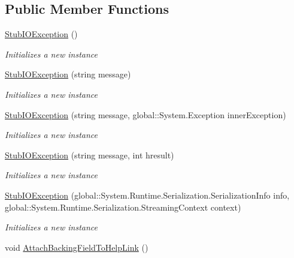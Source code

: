 \subsection*{Public Member Functions}
\begin{DoxyCompactItemize}
\item 
\hyperlink{class_system_1_1_i_o_1_1_fakes_1_1_stub_i_o_exception_a632db48de57725a9f9006c1367a88d7d}{Stub\-I\-O\-Exception} ()
\begin{DoxyCompactList}\small\item\em Initializes a new instance\end{DoxyCompactList}\item 
\hyperlink{class_system_1_1_i_o_1_1_fakes_1_1_stub_i_o_exception_a9a5b6db98677ec64d17792e6727a36d6}{Stub\-I\-O\-Exception} (string message)
\begin{DoxyCompactList}\small\item\em Initializes a new instance\end{DoxyCompactList}\item 
\hyperlink{class_system_1_1_i_o_1_1_fakes_1_1_stub_i_o_exception_a56e314a4be1640d91e2deed6fe8be1d0}{Stub\-I\-O\-Exception} (string message, global\-::\-System.\-Exception inner\-Exception)
\begin{DoxyCompactList}\small\item\em Initializes a new instance\end{DoxyCompactList}\item 
\hyperlink{class_system_1_1_i_o_1_1_fakes_1_1_stub_i_o_exception_a76f0a9c9cb3e1ba303a4737b1fad3439}{Stub\-I\-O\-Exception} (string message, int hresult)
\begin{DoxyCompactList}\small\item\em Initializes a new instance\end{DoxyCompactList}\item 
\hyperlink{class_system_1_1_i_o_1_1_fakes_1_1_stub_i_o_exception_ab7b3b6b871f1f366088b047392d8baa2}{Stub\-I\-O\-Exception} (global\-::\-System.\-Runtime.\-Serialization.\-Serialization\-Info info, global\-::\-System.\-Runtime.\-Serialization.\-Streaming\-Context context)
\begin{DoxyCompactList}\small\item\em Initializes a new instance\end{DoxyCompactList}\item 
void \hyperlink{class_system_1_1_i_o_1_1_fakes_1_1_stub_i_o_exception_a696d4ebd74f47e02df35c95c17b59ac4}{Attach\-Backing\-Field\-To\-Help\-Link} ()

\end{DoxyCompactItemize}
